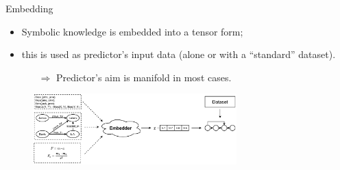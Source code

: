 \documentclass[presentation]{beamer}\mode<presentation>{\usetheme{AMSBolognaFC}}
\begin{document}
\begin{frame}[c]{Embedding}
    \begin{itemize}
        \item Symbolic knowledge is embedded into a tensor form;
        \item this is used as predictor's input data (alone or with a ``standard'' dataset).
        \begin{itemize}
            \item[$\Rightarrow$] Predictor's aim is manifold in most cases.
        \end{itemize} 
    \end{itemize}
    
    \begin{figure}
        \centering
        \includegraphics[width=0.7\textwidth]{figures/ski-embedding}
    \end{figure}
\end{frame}
\end{document}
